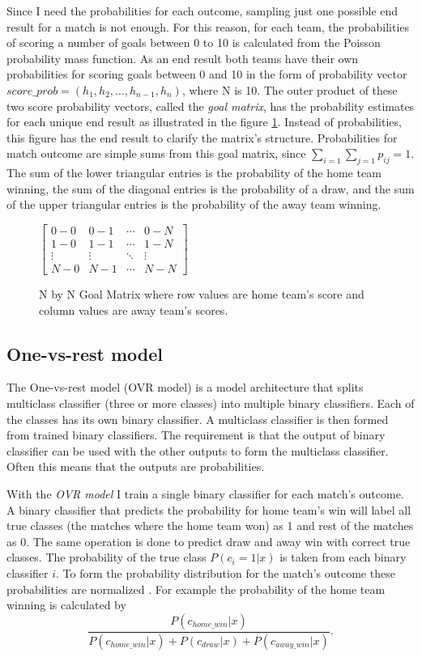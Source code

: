 Since I need the probabilities for each outcome, sampling just one possible end result for a match is not enough. For this reason, for each team, the probabilities of scoring a number of goals between 0 to 10 is calculated from the Poisson probability mass function. As an end result both teams have their own probabilities for scoring goals between 0 and 10 in the form of probability vector $score\_prob = \left( h _ { 1 } , h _ { 2 } , \dots , h _ { n - 1 } , h _ { n } \right)$, where N is 10. The outer product of these two score probability vectors, called the \textit{goal matrix}, has the probability estimates for each unique end result as illustrated in the figure \ref{fig:goal_matrix}. Instead of probabilities, this figure has the end result to clarify the matrix's structure. Probabilities for match outcome are simple sums from this goal matrix, since $\sum_{i=1}\sum_{j=1}p_{ij} = 1$. The sum of the lower triangular entries is the probability of the home team winning, the sum of the diagonal entries is the probability of a draw, and the sum of the upper triangular entries is the probability of the away team winning.
\begin{figure}
    $\begin{bmatrix}
    0-0 & 0-1 & \cdots & 0-N \\
    1-0 & 1-1 & \cdots   &1-N \\
    \vdots & \vdots   & \ddots & \vdots \\
    N-0 & N-1 & \cdots & N-N\end{bmatrix}$
\caption{N by N Goal Matrix where row values are home team's score and column values are away team's scores.}
\label{fig:goal_matrix}
\end{figure}

\subsection{One-vs-rest model}
The One-vs-rest model (OVR model) is a model architecture that splits multiclass classifier (three or more classes) into multiple binary classifiers. Each of the classes has its own binary classifier. A multiclass classifier is then formed from trained binary classifiers. The requirement is that the output of binary classifier can be used with the other outputs to form the multiclass classifier. Often this means that the outputs are probabilities.

With the \textit{OVR model} I train a single binary classifier for each match's outcome. A binary classifier that predicts the probability for home team's win will label all true classes (the matches where the home team won) as 1 and rest of the matches as 0. The same operation is done to predict draw and away win with correct true classes. The probability of the true class $P(c_i = 1 | x)$ is taken from each binary classifier $i$. To form the probability distribution for the match's outcome these probabilities are normalized \cite{zadrozny2002transforming}. For example the probability of the home team winning is calculated by
\begin{equation}
\frac{P(c_{home\_win}| x)}{P(c_{home\_win}| x) + P(c_{draw}| x) + P(c_{away\_win}| x)} \text{.}
\end{equation}

